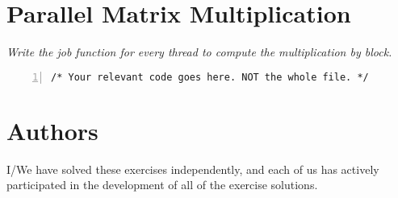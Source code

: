 \documentclass{article}
\begin{document}
\section{Parallel Matrix Multiplication}

\begin{ExerciseList}
\Exercise
{}
\Question
\emph{Write the job function for every thread to compute the
  multiplication by block.}

\begin{lstlisting}[basicstyle=\small\sffamily,
keywords={break,case,const,continue,default,else,enum,
for,if,return,switch,while,do,long,void,int,float,double,
char,struct,typedef,include,size\_t},
keywordstyle={\color{blue}},
comment={[l]{//}}, morecomment={[s]{/*}{*/}}, commentstyle=\itshape,
columns={[l]flexible}, numbers=left, numberstyle=\tiny,
frameround=fftt, frame=shadowbox, captionpos=b,
caption={Parallelized matrix multiplication by block.},
label=LST:blockmatmult]
/* Your relevant code goes here. NOT the whole file. */
\end{lstlisting}

\end{ExerciseList}


\newpage
\section{Authors}
I/We have solved these exercises independently, and each of us has actively
participated in the development of all of the exercise solutions.
\vspace{1cm}
\end{document}
